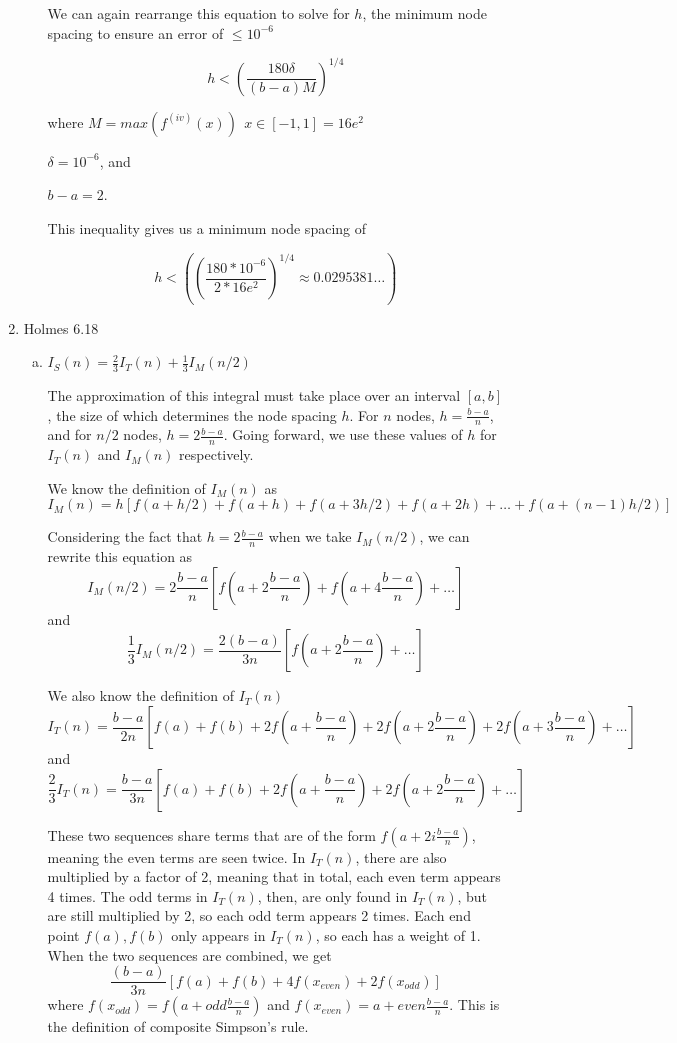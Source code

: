 \documentclass[11pt]{article}
\begin{document}
\begin{enumerate}
\begin{enumerate}
		We can again rearrange this equation to solve for $h$, the minimum node spacing to ensure an error of $\leq 10^{-6}$

		\[
		h < (\frac{180\delta}{(b-a)M})^{1/4}
		\]

		where $M=max(f^{(iv)}(x))\ \ x\in[-1,1] = 16e^2$

		$\delta = 10^{-6}$, and

		$b-a=2$.

		This inequality gives us a minimum node spacing of

		\[
		h < ((\frac{180*10^{-6}}{2*16e^2})^{1/4} \approx 0.0295381\ldots)
		\]

		\medskip

	\end{enumerate}

	\item Holmes 6.18

	\begin{enumerate}[(a)]

		\item $I_S(n) = \frac{2}{3}I_T(n) + \frac{1}{3}I_M(n/2)$

		The approximation of this integral must take place over an interval $[a,b]$, the size of which determines the node spacing $h$.
		For $n$ nodes, $h=\frac{b-a}{n}$, and for $n/2$ nodes, $h = 2\frac{b-a}{n}$. Going forward, we use these values of $h$ for $I_T(n)$ and $I_M(n)$ respectively.

		\medskip

		We know the definition of $I_M(n)$ as
		\[
		I_M(n) = h[f(a+h/2) + f(a+h) + f(a+3h/2) + f(a+2h) + \ldots + f(a+(n-1)h/2)]
		\]

		\medskip

		Considering the fact that $h=2\frac{b-a}{n}$ when we take $I_M(n/2)$, we can rewrite this equation as
		\[
		I_M(n/2) = 2\frac{b-a}{n}[f(a+2\frac{b-a}{n}) + f(a+4\frac{b-a}{n}) + \ldots]
		\]
		and
		\[
		\frac{1}{3}I_M(n/2) = \frac{2(b-a)}{3n}[f(a+2\frac{b-a}{n}) + \ldots]
		\]

		\medskip

		We also know the definition of $I_T(n)$
		\[
		I_T(n) = \frac{b-a}{2n}[f(a) + f(b) + 2f(a+\frac{b-a}{n}) + 2f(a+2\frac{b-a}{n}) + 2f(a+3\frac{b-a}{n})+\ldots]
		\]
		and
		\[
		\frac{2}{3}I_T(n) = \frac{b-a}{3n}[f(a) + f(b) + 2f(a+\frac{b-a}{n}) + 2f(a+2\frac{b-a}{n}) + \ldots]
		\]

		\medskip

		These two sequences share terms that are of the form $f(a+2i\frac{b-a}{n})$, meaning the even terms are seen twice. In $I_T(n)$, there are also multiplied by a factor of 2, meaning that in total, each even term appears 4 times. The odd terms in $I_T(n)$, then, are only found in $I_T(n)$, but are still multiplied by 2, so each odd term appears 2 times. Each end point $f(a), f(b)$ only appears in $I_T(n)$, so each has a weight of 1. When the two sequences are combined, we get
		\[
		\frac{(b-a)}{3n}[f(a) + f(b) + 4f(x_{even}) + 2f(x_{odd})]
		\]
		where $f(x_{odd}) = f(a+odd\frac{b-a}{n})$ and $f(x_{even}) = a+even\frac{b-a}{n}$. This is the definition of composite Simpson's rule.


\end{enumerate}
\end{enumerate}
\end{document}
